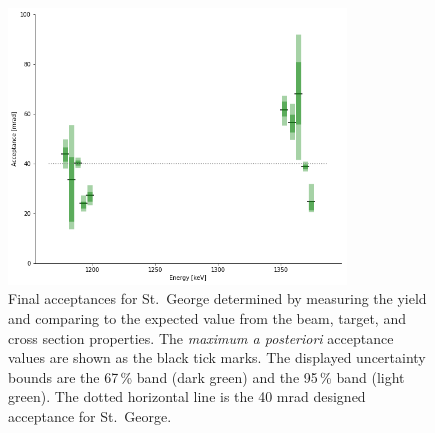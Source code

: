\begin{figure}[h]
    \begin{center}
        \centerline{
            \includegraphics[width=0.8\textwidth]{figures/acceptance_uncertainty.png}}
        \caption[Final acceptances]{Final acceptances for St.\ George
            determined by measuring the \alpa{} yield and comparing to
            the expected value from the beam, target, and cross section
            properties. The \textit{maximum a posteriori} acceptance
            values are shown as the black tick marks. The displayed
            uncertainty bounds are the 67\,\% band (dark green) and the
            95\,\% band (light green). The dotted horizontal line is the
            40 mrad designed acceptance for St.\ George.}
        \label{fig:final-acceptance}
    \end{center}
\end{figure}

